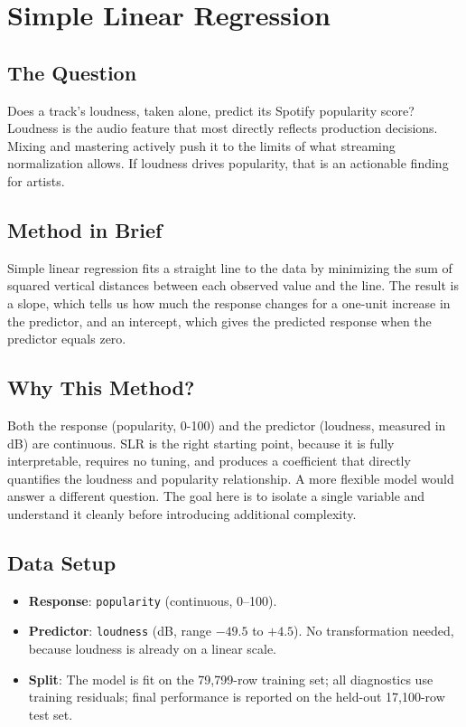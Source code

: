 \documentclass[12pt, oneside]{book}
\begin{document}
\chapter{Simple Linear Regression}
 
\section{The Question}
 
Does a track's loudness, taken alone, predict its Spotify popularity score? Loudness is the audio feature that most directly reflects production decisions. Mixing and mastering actively push it to the limits of what streaming normalization allows. If loudness drives popularity, that is an actionable finding for artists.
 
\section{Method in Brief}
 
Simple linear regression fits a straight line to the data by minimizing the sum of squared vertical distances between each observed value and the line. The result is a slope, which tells us how much the response changes for a one-unit increase in the predictor, and an intercept, which gives the predicted response when the predictor equals zero.

\section{Why This Method?}
 
Both the response (popularity, 0-100) and the predictor (loudness, measured in dB) are continuous. SLR is the right starting point, because it is fully interpretable, requires no tuning, and produces a coefficient that directly quantifies the loudness and popularity relationship. A more flexible model would answer a different question. The goal here is to isolate a single variable and understand it cleanly before introducing additional complexity.
 
\section{Data Setup}
 
\begin{itemize}
    \item \textbf{Response}: \texttt{popularity} (continuous, 0--100).
    \item \textbf{Predictor}: \texttt{loudness} (dB, range $-49.5$ to $+4.5$). No transformation needed, because loudness is already on a linear scale.
    \item \textbf{Split}: The model is fit on the 79{,}799-row training set; all diagnostics use training residuals; final performance is reported on the held-out 17{,}100-row test set.
\end{itemize}
 
\end{document}
